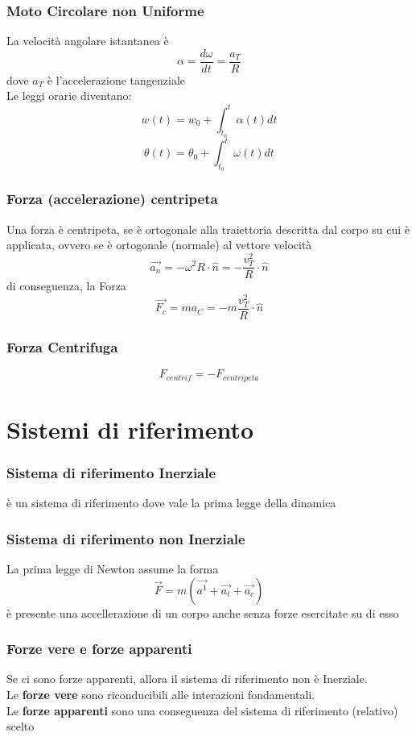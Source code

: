 \documentclass[a4paper]{report}
\begin{document}
  \subsection{Moto Circolare non Uniforme}
  La velocità angolare istantanea è
  \[ \alpha = \frac{d\omega}{dt} = \frac{a_T}{R} \]
  dove $a_T$ è l'accelerazione tangenziale\\
  Le leggi orarie diventano:
  \[ w(t) = w_0 + \int_{t_0}^t \alpha(t) dt \]
  \[ \theta(t) = \theta_0 + \int_{t_0}^t \omega(t) dt \]

  \subsection{Forza (accelerazione) centripeta}
  Una forza è centripeta, se è ortogonale alla traiettoria descritta dal corpo su cui è applicata, ovvero se è ortogonale (normale) al vettore velocità
  \[ \vec{a_n} = -\omega^2 R \cdot \hat{n} = -\frac{v_T^2}{R} \cdot \hat{n} \]
  di conseguenza, la Forza
  \[ \vec{F_c} = ma_C =  -m\frac{v_T^2}{R} \cdot \hat{n}\]

  \subsection{Forza Centrifuga}

  \[ F_{centrif} = - F_{centripeta} \]





  \chapter{Sistemi di riferimento}
  \subsection{Sistema di riferimento Inerziale}
  è un sistema di riferimento dove vale la prima legge della dinamica
  \subsection{Sistema di riferimento non Inerziale}
  La prima legge di Newton assume la forma
  \[ \vec{F} = m(\vec{a^1} + \vec{a_t} + \vec{a_c}) \]
  è presente una accellerazione di un corpo anche senza forze esercitate su di esso
  \subsection{Forze vere e forze apparenti}
  Se ci sono forze apparenti, allora il sistema di riferimento non è Inerziale. \\
  Le \textbf{forze vere} sono riconducibili alle interazioni fondamentali.\\
  Le \textbf{forze apparenti} sono una conseguenza del sistema di riferimento (relativo) scelto
\end{document}
